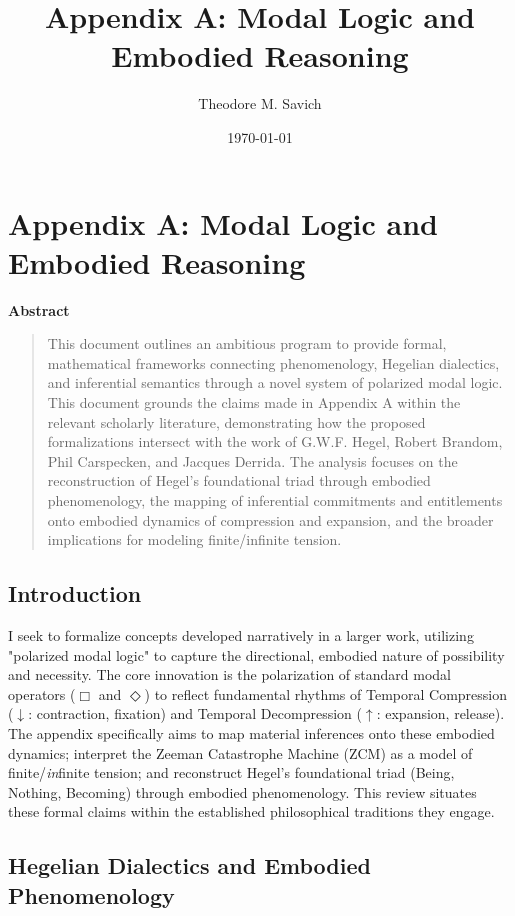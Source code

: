 \documentclass[12pt]{book}
\title{Appendix A: Modal Logic and Embodied Reasoning}
\author{Theodore M. Savich}
\date{\today}
\newenvironment{abstract}
    { %
      \begin{center} %
        \textbf{Abstract} %
      \end{center}
      \vspace{\baselineskip} %
      \begin{quotation} %
      \small %
    }
    { %
      \end{quotation} %
      \bigskip %
    }
\begin{document}
\maketitle

\chapter{Appendix A: Modal Logic and Embodied Reasoning}



\begin{abstract}
This document outlines an ambitious program to provide formal, mathematical frameworks connecting phenomenology, Hegelian dialectics, and inferential semantics through a novel system of polarized modal logic. This document grounds the claims made in Appendix A within the relevant scholarly literature, demonstrating how the proposed formalizations intersect with the work of G.W.F. Hegel, Robert Brandom, Phil Carspecken, and Jacques Derrida. The analysis focuses on the reconstruction of Hegel's foundational triad through embodied phenomenology, the mapping of inferential commitments and entitlements onto embodied dynamics of compression and expansion, and the broader implications for modeling finite/infinite tension.
\end{abstract}

\section{Introduction}

I seek to formalize concepts developed narratively in a larger work, utilizing "polarized modal logic" to capture the directional, embodied nature of possibility and necessity. The core innovation is the polarization of standard modal operators ($\Box$ and $\Diamond$) to reflect fundamental rhythms of Temporal Compression ($\downarrow$: contraction, fixation) and Temporal Decompression ($\uparrow$: expansion, release). The appendix specifically aims to map material inferences onto these embodied dynamics; interpret the Zeeman Catastrophe Machine (ZCM) as a model of finite/\textit{in}finite tension; and reconstruct Hegel's foundational triad (Being, Nothing, Becoming) through embodied phenomenology. This review situates these formal claims within the established philosophical traditions they engage.

\section{Hegelian Dialectics and Embodied Phenomenology}
\end{document}
